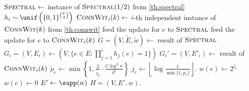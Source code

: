 \begin{algorithm}
	\caption{\textsc{agm}: sparsifier construction in dynamic streams}
	\label{alg:dynsampling}
	
	\begin{algorithmic}[1]
		\Statex
		\State $\textsc{Spectral}\gets $ instance of $\textsc{Spectral}(1/2)$ from \cref{th:spectral}
		\State $h_i \sim \unif\left(\{0,1\}^{\binom{V}{2}}\right)$ 
		\State $\textsc{ConnWit}_i(k) \gets $ $i$-th independent instance of $\textsc{ConnWit}(k)$ from \cref{th:connwit} \label{lineagm:feedconnwit}
		\EndFor
		\EndProcedure
		\Statex
		 
		\State feed the update for $e$ to $\textsc{Spectral}$
		\State feed the update for $e$ to $\textsc{ConnWit}_i(k)$
		\EndIf
		\EndFor
		\EndProcedure
		\Statex
		\State $\tilde{G}=(V,\tilde{E},\tilde{w}) \gets $ result of $\textsc{Spectral}$
		\State $G_i= (V,E_i) \gets (V,\{e \in E: \prod_{j = 1}^{i} h_j(e)=1\})$ 
		\State $G_i'=(V,E'_i) \gets $ result of $\textsc{ConnWit}_i(k)$ 
		\EndFor
		\State $\tilde{p}_e \gets \min \left\{1, \frac{2}{\tilde{\lambda}_e}\cdot\frac{C \log^3 n}{\delta^2} \right\} $
		\State $j_e \gets  \left\lfloor \log \frac{1}{\min\{1, \tilde{p}_e\}}\right\rfloor $.
		\State $w(e) \gets 2^{j_e}$
		\Else
		\State $w(e)\gets 0$
		\EndIf
		\EndFor
		\State $E' \gets \supp(w)$
		\State \Return $H=(V,E',w)$.
		\EndProcedure
	\end{algorithmic}
\end{algorithm}

